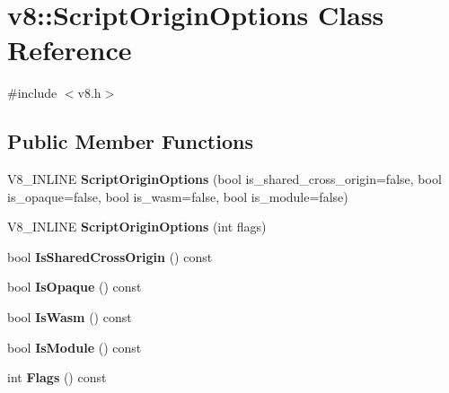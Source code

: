 \hypertarget{classv8_1_1ScriptOriginOptions}{}\section{v8\+:\+:Script\+Origin\+Options Class Reference}
\label{classv8_1_1ScriptOriginOptions}


{\ttfamily \#include $<$v8.\+h$>$}

\subsection*{Public Member Functions}
\begin{DoxyCompactItemize}
\item 
\mbox{\label{classv8_1_1ScriptOriginOptions_ae041fe05628cdd2d434c8780f45ac1e4}} 
V8\+\_\+\+I\+N\+L\+I\+NE {\bfseries Script\+Origin\+Options} (bool is\+\_\+shared\+\_\+cross\+\_\+origin=false, bool is\+\_\+opaque=false, bool is\+\_\+wasm=false, bool is\+\_\+module=false)
\item 
\mbox{\label{classv8_1_1ScriptOriginOptions_a5c814c5602db2c9ed5c6bc7f05b1d430}} 
V8\+\_\+\+I\+N\+L\+I\+NE {\bfseries Script\+Origin\+Options} (int flags)
\item 
\mbox{\label{classv8_1_1ScriptOriginOptions_af899dc2dfbcfdbe84eb57ca5f6e92c86}} 
bool {\bfseries Is\+Shared\+Cross\+Origin} () const
\item 
\mbox{\label{classv8_1_1ScriptOriginOptions_ab6fb2e1fee9bf7cd5a4b141c3abc5df3}} 
bool {\bfseries Is\+Opaque} () const
\item 
\mbox{\label{classv8_1_1ScriptOriginOptions_a31e78eb1c657b0cf029116b6147f03a5}} 
bool {\bfseries Is\+Wasm} () const
\item 
\mbox{\label{classv8_1_1ScriptOriginOptions_a30b72cba616f576272a29b6e199c9c35}} 
bool {\bfseries Is\+Module} () const
\item 
\mbox{\label{classv8_1_1ScriptOriginOptions_ad66acb13746ba12f6b5177c215e4d10d}} 
int {\bfseries Flags} () const
\end{DoxyCompactItemize}


